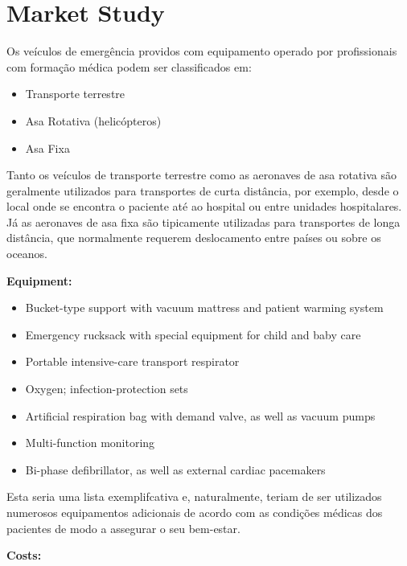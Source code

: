 \section{Market Study}
\label{market}

Os veículos de emergência providos com equipamento operado por profissionais com formação médica podem ser classificados em:
\begin{itemize}
    \item Transporte terrestre
    \item Asa Rotativa (helicópteros)
    \item Asa Fixa
\end{itemize}

Tanto os veículos de transporte terrestre como as aeronaves de asa rotativa são geralmente utilizados para transportes de curta distância, por exemplo, desde o local onde se encontra o paciente até ao hospital ou entre unidades hospitalares. Já as aeronaves de asa fixa são tipicamente utilizadas para transportes de longa distância, que normalmente requerem deslocamento entre países ou sobre os oceanos.

\textbf{Equipment:}
\begin{itemize}
    \item Bucket-type support with vacuum mattress and patient warming system
    \item Emergency rucksack with special equipment for child and baby care
    \item Portable intensive-care transport respirator \item Oxygen; infection-protection sets
    \item Artificial respiration bag with demand valve, as well as vacuum pumps
    \item Multi-function monitoring
    \item Bi-phase defibrillator, as well as external cardiac pacemakers
\end{itemize}
\par Esta seria uma lista exemplifcativa e, naturalmente, teriam de ser utilizados numerosos equipamentos adicionais de acordo com as condições médicas dos pacientes de modo a assegurar o seu bem-estar.

\textbf{Costs:}
